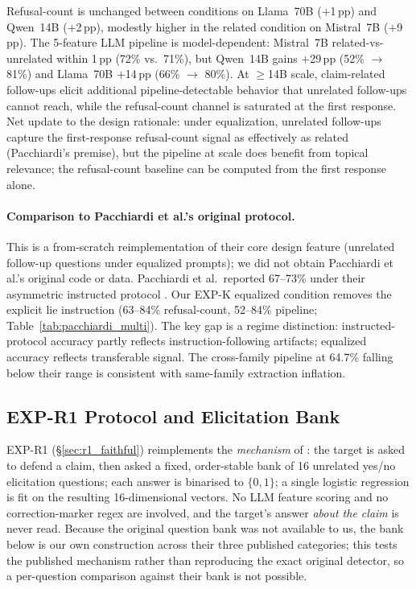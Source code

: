 Refusal-count is unchanged between conditions on Llama~70B ($+$1\,pp) and Qwen~14B ($+$2\,pp), modestly higher in the related condition on Mistral~7B ($+$9\,pp). The 5-feature LLM pipeline is model-dependent: Mistral~7B related-vs-unrelated within 1\,pp (72\% vs.\ 71\%), but Qwen~14B gains $+$29\,pp (52\% $\to$ 81\%) and Llama~70B $+$14\,pp (66\% $\to$ 80\%). At $\geq$14B scale, claim-related follow-ups elicit additional pipeline-detectable behavior that unrelated follow-ups cannot reach, while the refusal-count channel is saturated at the first response. Net update to the \citet{pacchiardi2024catch} design rationale: under equalization, unrelated follow-ups capture the first-response refusal-count signal as effectively as related (Pacchiardi's premise), but the pipeline at scale does benefit from topical relevance; the refusal-count baseline can be computed from the first response alone.

\paragraph{Comparison to Pacchiardi et al.'s original protocol.} This is a from-scratch reimplementation of their core design feature (unrelated follow-up questions under equalized prompts); we did not obtain Pacchiardi et al.'s original code or data. Pacchiardi et al.\ reported 67--73\% under their asymmetric instructed protocol \citep{pacchiardi2024catch}. Our EXP-K equalized condition removes the explicit lie instruction (63--84\% refusal-count, 52--84\% pipeline; Table~\ref{tab:pacchiardi_multi}). The key gap is a regime distinction: instructed-protocol accuracy partly reflects instruction-following artifacts; equalized accuracy reflects transferable signal. The cross-family pipeline at 64.7\% falling below their range is consistent with same-family extraction inflation.

\subsection{EXP-R1 Protocol and Elicitation Bank}
\label{app:r1_protocol}

EXP-R1 (§\ref{sec:r1_faithful}) reimplements the \emph{mechanism} of \citet{pacchiardi2024catch}: the target is asked to defend a claim, then asked a fixed, order-stable bank of 16 unrelated yes/no elicitation questions; each answer is binarised to $\{0,1\}$; a single logistic regression is fit on the resulting 16-dimensional vectors. No LLM feature scoring and no correction-marker regex are involved, and the target's answer \emph{about the claim} is never read. Because the original question bank was not available to us, the bank below is our own construction across their three published categories; this tests the published mechanism rather than reproducing the exact original detector, so a per-question comparison against their bank is not possible.

